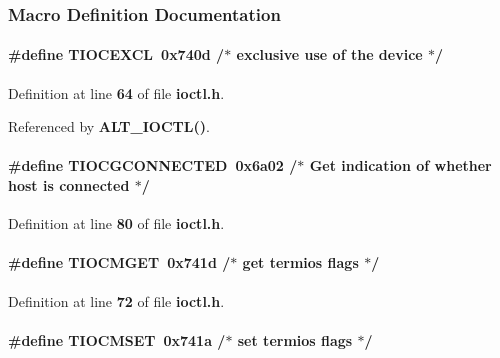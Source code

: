 \subsubsection{Macro Definition Documentation}
\paragraph[{T\+I\+O\+C\+E\+X\+CL}]{\setlength{\rightskip}{0pt plus 5cm}\#define T\+I\+O\+C\+E\+X\+CL~0x740d /$\ast$ exclusive use of the device $\ast$/}\label{ioctl_8h_a567894a568861994414b041f246cc9ac}


Definition at line {\bf 64} of file {\bf ioctl.\+h}.



Referenced by {\bf A\+L\+T\+\_\+\+I\+O\+C\+T\+L()}.

\paragraph[{T\+I\+O\+C\+G\+C\+O\+N\+N\+E\+C\+T\+ED}]{\setlength{\rightskip}{0pt plus 5cm}\#define T\+I\+O\+C\+G\+C\+O\+N\+N\+E\+C\+T\+ED~0x6a02 /$\ast$ Get indication of whether host is connected $\ast$/}\label{ioctl_8h_a0732072fac74cf071df7e38bff9df5a2}


Definition at line {\bf 80} of file {\bf ioctl.\+h}.

\paragraph[{T\+I\+O\+C\+M\+G\+ET}]{\setlength{\rightskip}{0pt plus 5cm}\#define T\+I\+O\+C\+M\+G\+ET~0x741d /$\ast$ get termios flags $\ast$/}\label{ioctl_8h_a07a6b5abd57b47faba5faf23700b365f}


Definition at line {\bf 72} of file {\bf ioctl.\+h}.

\paragraph[{T\+I\+O\+C\+M\+S\+ET}]{\setlength{\rightskip}{0pt plus 5cm}\#define T\+I\+O\+C\+M\+S\+ET~0x741a /$\ast$ set termios flags $\ast$/}\label{ioctl_8h_aae2ec9a6a81b8163324827366ef5d1d2}


